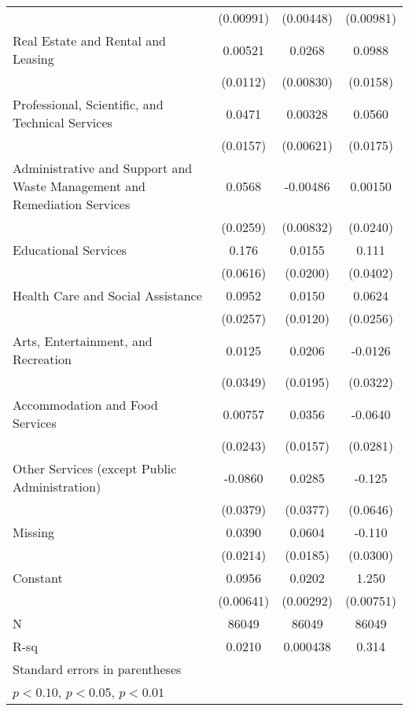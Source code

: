 {\begin{longtable}{l*{3}{c}}
                &(0.00991)         &(0.00448)         &(0.00981)         \\
Real Estate and Rental and Leasing&  0.00521         &   0.0268\sym{***}&   0.0988\sym{***}\\
                & (0.0112)         &(0.00830)         & (0.0158)         \\
Professional, Scientific, and Technical Services&   0.0471\sym{***}&  0.00328         &   0.0560\sym{***}\\
                & (0.0157)         &(0.00621)         & (0.0175)         \\
Administrative and Support and Waste Management and Remediation Services&   0.0568\sym{**} & -0.00486         &  0.00150         \\
                & (0.0259)         &(0.00832)         & (0.0240)         \\
Educational Services&    0.176\sym{***}&   0.0155         &    0.111\sym{***}\\
                & (0.0616)         & (0.0200)         & (0.0402)         \\
Health Care and Social Assistance&   0.0952\sym{***}&   0.0150         &   0.0624\sym{**} \\
                & (0.0257)         & (0.0120)         & (0.0256)         \\
Arts, Entertainment, and Recreation&   0.0125         &   0.0206         &  -0.0126         \\
                & (0.0349)         & (0.0195)         & (0.0322)         \\
Accommodation and Food Services&  0.00757         &   0.0356\sym{**} &  -0.0640\sym{**} \\
                & (0.0243)         & (0.0157)         & (0.0281)         \\
Other Services (except Public Administration)&  -0.0860\sym{**} &   0.0285         &   -0.125\sym{*}  \\
                & (0.0379)         & (0.0377)         & (0.0646)         \\
Missing         &   0.0390\sym{*}  &   0.0604\sym{***}&   -0.110\sym{***}\\
                & (0.0214)         & (0.0185)         & (0.0300)         \\
Constant        &   0.0956\sym{***}&   0.0202\sym{***}&    1.250\sym{***}\\
                &(0.00641)         &(0.00292)         &(0.00751)         \\
\midrule
N               &    86049         &    86049         &    86049         \\
R-sq            &   0.0210         & 0.000438         &    0.314         \\
\bottomrule
\multicolumn{4}{l}{\footnotesize Standard errors in parentheses}\\
\multicolumn{4}{l}{\footnotesize \sym{*} \(p<0.10\), \sym{**} \(p<0.05\), \sym{***} \(p<0.01\)}\\
\end{longtable}
}
